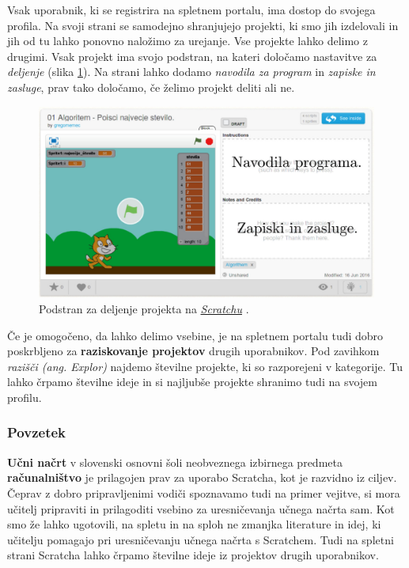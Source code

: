 Vsak uporabnik, ki se registrira na spletnem portalu, ima dostop do
svojega profila. Na svoji strani se samodejno shranjujejo projekti, ki
smo jih izdelovali in jih od tu lahko ponovno naložimo za
urejanje. Vse projekte lahko delimo z drugimi. Vsak projekt ima svojo
podstran, na kateri določamo nastavitve za \emph{deljenje} (slika
\ref{fig:web:scratch:deljenje}). Na strani lahko dodamo \emph{navodila
  za program} in \emph{zapiske in zasluge}, prav tako določamo, če
želimo projekt deliti ali ne.

\begin{figure}[h!]
  \centering
    \includegraphics [width=0.50\linewidth, keepaspectratio =
   1] {./images/sc_web/scratch_deljenje-v01o.jpg}
   \caption{Podstran za deljenje projekta na
     \emph{\href{https://scratch.mit.edu/}{Scratchu}}
     \cite{web:scratch}.}
    \label{fig:web:scratch:deljenje}
\end{figure}

Če je omogočeno, da lahko delimo vsebine, je na spletnem portalu tudi
dobro poskrbljeno za \textbf{raziskovanje projektov} drugih
uporabnikov. Pod zavihkom \emph{razišči (ang. Explor)} najdemo
številne projekte, ki so razporejeni v kategorije. Tu lahko črpamo
številne ideje in si najljubše projekte shranimo tudi na svojem
profilu.

\subsubsection{Povzetek}
\label{sec:scratch_povzetek}

\textbf{Učni načrt} v slovenski osnovni šoli neobveznega izbirnega
predmeta \textbf{računalništvo} je prilagojen prav za uporabo
Scratcha, kot je razvidno iz ciljev. Čeprav z dobro pripravljenimi
vodiči spoznavamo tudi na primer vejitve, si mora učitelj pripraviti
in prilagoditi vsebino za uresničevanja učnega načrta sam. Kot smo že
lahko ugotovili, na spletu in na sploh ne zmanjka literature in idej,
ki učitelju pomagajo pri uresničevanju učnega načrta s Scratchem. Tudi
na spletni strani Scratcha lahko črpamo številne ideje iz projektov
drugih uporabnikov.

